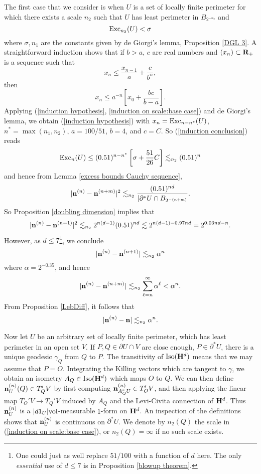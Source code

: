 The first case that we consider is when $U$ is a set of locally finite perimeter for which there exists a scale $n_2$ such that $U$ has least perimeter in $B_{2^{-n_2}}$ and
\begin{equation}\label{induction on scale:base case}
    \operatorname{Exc}_{n_2}(U) < \sigma
\end{equation}
where $\sigma, n_1$ are the constants given by de Giorgi's lemma, Proposition \ref{DGL 3}.
A straightforward induction shows that if $b > a$, $c$ are real numbers and $(x_n) \subset \mathbf{R}_+$ is a sequence such that
\begin{equation}\label{induction hypothesis}
x_n \leq \frac{x_{n - 1}}{a} + \frac{c}{b^n},
\end{equation}
then
\begin{equation}\label{induction conclusion}
x_n \leq a^{-n}\left[x_0 + \frac{bc}{b - a}\right].
\end{equation}
Applying (\ref{induction hypothesis}, \ref{induction on scale:base case}) and de Giorgi's lemma, we obtain (\ref{induction hypothesis}) with $x_n = \operatorname{Exc}_{n - n^*}(U)$, $n^* = \max(n_1, n_2)$, $a = 100/51$, $b = 4$, and $c = C$.
So (\ref{induction conclusion}) reads 
$$\operatorname{Exc}_n(U) \leq (0.51)^{n - n^*} \left[\sigma + \frac{51}{26}C\right] \lesssim_{n_2} (0.51)^n$$
and hence from Lemma \ref{excess bounds Cauchy sequence},
$$|\mathbf n^{(n)} - \mathbf n^{(n + m)}|^2 \lesssim_{n_2} \frac{(0.51)^{nd}}{|\partial^* U \cap B_{2^{-(n + m)}}}.$$
So Proposition \ref{doubling dimension} implies that 
$$|\mathbf n^{(n)} - \mathbf n^{(n + 1)}|^2 \lesssim_{n_2} 2^{n(d - 1)} (0.51)^{nd} \lesssim 2^{n(d - 1) - 0.97 nd} = 2^{0.03nd - n}.$$
However, as $d \leq 7$\footnote{One could just as well replace $51/100$ with a function of $d$ here. The only \emph{essential} use of $d \leq 7$ is in Proposition \ref{blowup theorem}.}, we conclude 
$$|\mathbf n^{(n)} - \mathbf n^{(n + 1)}| \lesssim_{n_2} \alpha^n$$
where $\alpha = 2^{-0.35}$, and hence 
$$|\mathbf n^{(n)} - \mathbf n^{(n + m)}| \lesssim_{n_2} \sum_{\ell=n}^\infty \alpha^\ell < \alpha^n.$$
From Proposition \ref{LebDiff}, it follows that 
\begin{equation}\label{normal convergence rate}
    |\mathbf n^{(n)} - \mathbf n| \lesssim_{n_2} \alpha^n.
\end{equation}

Now let $U$ be an arbitrary set of locally finite perimeter, which has least perimeter in an open set $V$.
If $P, Q \in \partial U \cap V$ are close enough, $P \in \partial^* U$, there is a unique geodesic $\gamma_Q$ from $Q$ to $P$.
The transitivity of $\operatorname{Iso}(\mathbf H^d)$ means that we may assume that $P = O$.
Integrating the Killing vectors which are tangent to $\gamma$, we obtain an isometry $A_Q \in \operatorname{Iso}(\mathbf H^d)$ which maps $O$ to $Q$.
We can then define $\mathbf n^{(n)}_U(Q) \in T_Q' V$ by first computing $\mathbf n^{(n)}_{A_Q^* U} \in T_O' V$, and then applying the linear map $T_O' V \to T_Q' V$ induced by $A_Q$ and the Levi-Civita connection of $\mathbf H^d$.
Thus $\mathbf n^{(n)}_U$ is a $|d1_U|\mathrm{vol}$-measurable $1$-form on $\mathbf H^d$.
An inspection of the definitions shows that $\mathbf n^{(n)}_U$ is continuous on $\partial^* U$.
We denote by $n_2(Q)$ the scale in (\ref{induction on scale:base case}), or $n_2(Q) = \infty$ if no such scale exists.

